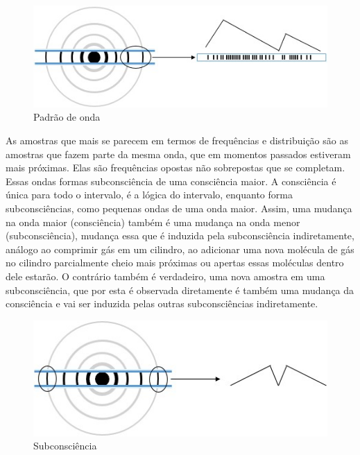 \begin{figure}[H]
\caption{Padrão de onda}
\label{fig:consciousness_waves}
\centering
\includegraphics[scale=1]{sections/images/consciousness_waves.jpg}
\end{figure}

As amostras que mais se parecem em termos de frequências e distribuição são as amostras que fazem parte da mesma onda, que em momentos passados estiveram mais próximas. Elas são frequências opostas não sobrepostas que se completam. Essas ondas formas subconsciência de uma consciência maior. A consciência é única para todo o intervalo, é a lógica do intervalo, enquanto forma subconsciências, como pequenas ondas de uma onda maior. Assim, uma mudança na onda maior (consciência) também é uma mudança na onda menor (subconsciência), mudança essa que é induzida pela subconsciência indiretamente, análogo ao comprimir gás em um cilindro, ao adicionar uma nova molécula de gás no cilindro parcialmente cheio mais próximas ou apertas essas moléculas dentro dele estarão. O contrário também é verdadeiro, uma nova amostra em uma subconsciência, que por esta é observada diretamente é também uma mudança da consciência e vai ser induzida pelas outras subconsciências indiretamente.

\begin{figure}[H]
\caption{Subconsciência}
\label{fig:consciousness_subconscious}
\centering
\includegraphics[scale=1]{sections/images/consciousness_subconscious.jpg}
\end{figure}

